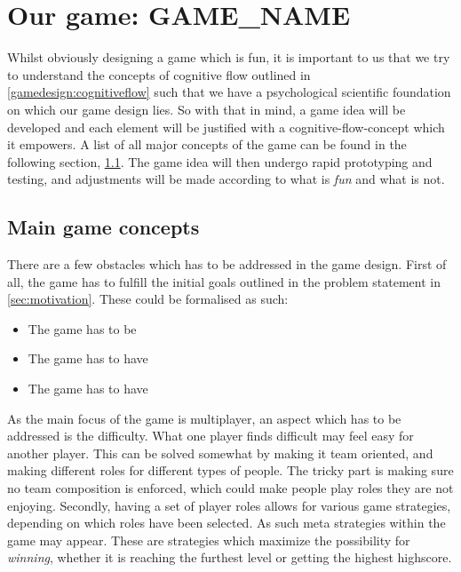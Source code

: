\section{Our game: GAME_NAME}

Whilst obviously designing a game which is fun, it is important to us that we try to understand the concepts of cognitive flow outlined in \ref{gamedesign:cognitiveflow} such that we have a psychological scientific foundation on which our game design lies. 
So with that in mind, a game idea will be developed and each element will be justified with a cognitive-flow-concept which it empowers. A list of all major concepts of the game can be found in the following section, \ref{gamedesign:maingameconcepts}. 
The game idea will then undergo rapid prototyping and testing, and adjustments will be made according to what is \emph{fun} and what is not.  

\subsection{Main game concepts}\label{gamedesign:maingameconcepts}
There are a few obstacles which has to be addressed in the game design. First of all, the game has to fulfill the initial goals outlined in the problem statement in \ref{sec:motivation}. These could be formalised as such:

\begin{itemize}
\item The game has to be 
\item The game has to have 
\item The game has to have 
\end{itemize}

As the main focus of the game is multiplayer, an aspect which has to be addressed is the difficulty. What one player finds difficult may feel easy for another player. This can be solved somewhat by making it team oriented, and making different roles for different types of people. The tricky part is making sure no team composition is enforced, which could make people play roles they are not enjoying.  
Secondly, having a set of player roles allows for various game strategies, depending on which roles have been selected. As such meta strategies within the game may appear. These are strategies which maximize the possibility for \emph{winning}, whether it is reaching the furthest level or getting the highest highscore. 

